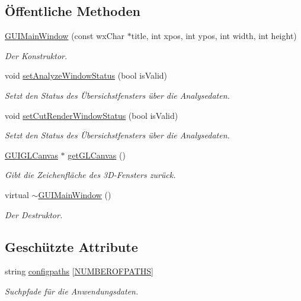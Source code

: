 \subsection*{Öffentliche Methoden}
\begin{DoxyCompactItemize}
\item 
\hyperlink{classGUIMainWindow_a55cb97ffda12d79c6d6d50c9de35a3fe}{G\-U\-I\-Main\-Window} (const wx\-Char $\ast$title, int xpos, int ypos, int width, int height)
\begin{DoxyCompactList}\small\item\em Der Konstruktor. \end{DoxyCompactList}\item 
void \hyperlink{classGUIMainWindow_a64f6c71f9d92ab4091670ad1d264b2d7}{set\-Analyze\-Window\-Status} (bool is\-Valid)
\begin{DoxyCompactList}\small\item\em Setzt den Status des Übersichstfensters über die Analysedaten. \end{DoxyCompactList}\item 
void \hyperlink{classGUIMainWindow_a4b8b9293b800ca5ff47d1cb3a75f06a5}{set\-Cut\-Render\-Window\-Status} (bool is\-Valid)
\begin{DoxyCompactList}\small\item\em Setzt den Status des Übersichstfensters über die Analysedaten. \end{DoxyCompactList}\item 
\hyperlink{classGUIGLCanvas}{G\-U\-I\-G\-L\-Canvas} $\ast$ \hyperlink{classGUIMainWindow_a52e68b866f7835c3691fd8fad8ba910d}{get\-G\-L\-Canvas} ()
\begin{DoxyCompactList}\small\item\em Gibt die Zeichenfläche des 3\-D-\/\-Fensters zurück. \end{DoxyCompactList}\item 
virtual \hyperlink{classGUIMainWindow_a16ca27363f15a5f2678417bbf26880d2}{$\sim$\-G\-U\-I\-Main\-Window} ()
\begin{DoxyCompactList}\small\item\em Der Destruktor. \end{DoxyCompactList}\end{DoxyCompactItemize}
\subsection*{Geschützte Attribute}
\begin{DoxyCompactItemize}
\item 
string \hyperlink{classGUIMainWindow_abc81190b8fea79f68a476028f11272b1}{configpaths} \mbox{[}\hyperlink{classGUIMainWindow_ae3eb6747c8ffa9e20e54c2d34f58bd40}{N\-U\-M\-B\-E\-R\-O\-F\-P\-A\-T\-H\-S}\mbox{]}
\begin{DoxyCompactList}\small\item\em Suchpfade für die Anwendungsdaten. \end{DoxyCompactList}\end{DoxyCompactItemize}
